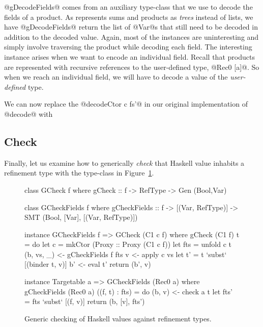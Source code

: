 @gDecodeFields@ comes from an auxiliary type-class that we use to decode the
fields of a product. As \GhcGenerics represents sums and products as
\emph{trees} instead of lists, we have @gDecodeFields@ return the list of
@Var@s that still need to be decoded in addition to the decoded value.
%
Again, most of the instances are uninteresting and simply involve traversing the
product while decoding each field. The interesting instance arises when we want
to encode an individual field. Recall that products are represented with
recursive references to the user-defined type, \eg @Rec0 [a]@. So when we reach
an individual field, we will have to decode a value of the \emph{user-defined}
type.

We can now replace the @decodeCtor c fs'@ in our original implementation of @decode@
with
%
%
%
%     
%
\subsection{Check}\label{sec:generic-check}
Finally, let us examine how to generically \emph{check} that Haskell value 
inhabits a refinement type with the type-class in Figure~\ref{fig:generic-check}.
%
\begin{figure}[ht]
\begin{mdframed}
\begin{CenteredBox}
\begin{code}
  class GCheck f where
    gCheck :: f -> RefType -> Gen (Bool,Var)
    
  class GCheckFields f where
    gCheckFields :: f -> [(Var, RefType)]
                 -> SMT (Bool, [Var], [(Var, RefType)])
                 
  instance GCheckFields f => GCheck (C1 c f) where
    gCheck (C1 f) t = do
      let c       = mkCtor (Proxy :: Proxy (C1 c f))
      let fts     = unfold c t
      (b, vs, _) <- gCheckFields f fts
      v          <- apply c vs
      let t'      = t `subst` [(binder t, v)]
      b'         <- eval t'
      return (b', v)
      
  instance Targetable a => GCheckFields (Rec0 a) where
    gCheckFields (Rec0 a) ((f, t) : fts) = do
      (b, v)  <- check a t
      let fts' = fts `subst` [(f, v)]
      return (b, [v], fts')
\end{code}
\end{CenteredBox}
\end{mdframed}
\caption{Generic checking of Haskell values against refinement types.}\label{fig:generic-check}
\end{figure}

